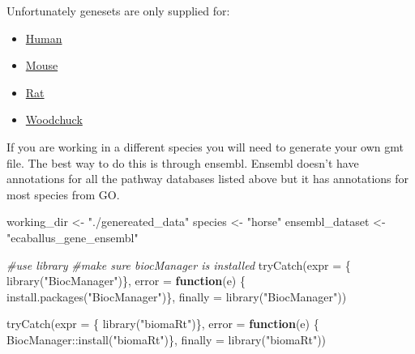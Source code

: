 \documentclass[
]{book}
\newenvironment{Shaded}{\begin{snugshade}}{\end{snugshade}}
\newcommand{\AttributeTok}[1]{\textcolor[rgb]{0.77,0.63,0.00}{#1}}
\newcommand{\CommentTok}[1]{\textcolor[rgb]{0.56,0.35,0.01}{\textit{#1}}}
\newcommand{\ControlFlowTok}[1]{\textcolor[rgb]{0.13,0.29,0.53}{\textbf{#1}}}
\newcommand{\FunctionTok}[1]{\textcolor[rgb]{0.00,0.00,0.00}{#1}}
\newcommand{\NormalTok}[1]{#1}
\newcommand{\OtherTok}[1]{\textcolor[rgb]{0.56,0.35,0.01}{#1}}
\newcommand{\SpecialCharTok}[1]{\textcolor[rgb]{0.00,0.00,0.00}{#1}}
\newcommand{\StringTok}[1]{\textcolor[rgb]{0.31,0.60,0.02}{#1}}
\providecommand{\tightlist}{%
  \setlength{\itemsep}{0pt}\setlength{\parskip}{0pt}}
\begin{document}
Unfortunately genesets are only supplied for:

\begin{itemize}
\tightlist
\item
  \href{https://download.baderlab.org/EM_Genesets/current_release/Human/}{Human}
\item
  \href{https://download.baderlab.org/EM_Genesets/current_release/Mouse/}{Mouse}
\item
  \href{https://download.baderlab.org/EM_Genesets/current_release/Rat/}{Rat}
\item
  \href{https://download.baderlab.org/EM_Genesets/current_release/Woodchuck/}{Woodchuck}
\end{itemize}

If you are working in a different species you will need to generate your own gmt file. The best way to do this is through ensembl. Ensembl doesn't have annotations for all the pathway databases listed above but it has annotations for most species from GO.

\begin{Shaded}
\begin{Highlighting}[]
\NormalTok{working\_dir }\OtherTok{\textless{}{-}} \StringTok{"./genereated\_data"}
\NormalTok{species }\OtherTok{\textless{}{-}} \StringTok{"horse"}
\NormalTok{ensembl\_dataset }\OtherTok{\textless{}{-}} \StringTok{"ecaballus\_gene\_ensembl"}
\end{Highlighting}
\end{Shaded}

\begin{Shaded}
\begin{Highlighting}[]
\CommentTok{\#use library}
\CommentTok{\#make sure biocManager is installed}
\FunctionTok{tryCatch}\NormalTok{(}\AttributeTok{expr =}\NormalTok{ \{ }\FunctionTok{library}\NormalTok{(}\StringTok{"BiocManager"}\NormalTok{)\}, }
         \AttributeTok{error =} \ControlFlowTok{function}\NormalTok{(e) \{ }
           \FunctionTok{install.packages}\NormalTok{(}\StringTok{"BiocManager"}\NormalTok{)\}, }
         \AttributeTok{finally =} \FunctionTok{library}\NormalTok{(}\StringTok{"BiocManager"}\NormalTok{))}


\FunctionTok{tryCatch}\NormalTok{(}\AttributeTok{expr =}\NormalTok{ \{ }\FunctionTok{library}\NormalTok{(}\StringTok{"biomaRt"}\NormalTok{)\}, }
         \AttributeTok{error =} \ControlFlowTok{function}\NormalTok{(e) \{ }
\NormalTok{           BiocManager}\SpecialCharTok{::}\FunctionTok{install}\NormalTok{(}\StringTok{"biomaRt"}\NormalTok{)\}, }
         \AttributeTok{finally =} \FunctionTok{library}\NormalTok{(}\StringTok{"biomaRt"}\NormalTok{))}
\end{Highlighting}
\end{Shaded}
\end{document}
